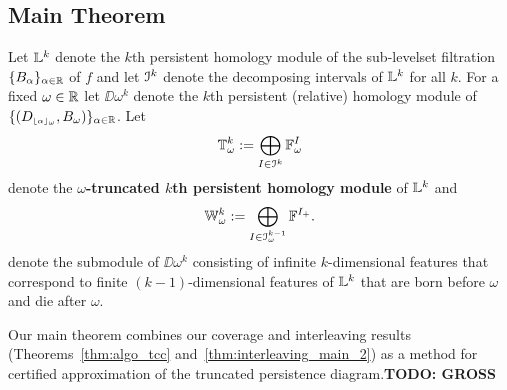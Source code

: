 %

\subsection{Main Theorem}

Let $\mathbb{L}^k$ denote the $k$th persistent homology module of the sub-levelset filtration $\{B_\alpha\}_{\alpha\in\mathbb{R}}$ of $f$ and let $\mathcal{I}^k$ denote the decomposing intervals of $\mathbb{L}^k$ for all $k$.
For a fixed $\omega\in\mathbb{R}$ let $\DD{\omega}^k$ denote the $k$th persistent (relative) homology module of $\{(D_{\scriptscriptstyle \lfloor\alpha\rfloor_{\omega}},B_\omega)\}_{\alpha\in\mathbb{R}}$.
Let
\[\mathbb{T}_\omega^k := \bigoplus_{I\in\mathcal{I}^k} \mathbb{F}_\omega^I\]
denote the \textbf{$\omega$-truncated $k$th persistent homology module} of $\mathbb{L}^k$ and
\[ \mathbb{W}_\omega^k := \bigoplus_{I\in \mathcal{I}_\omega^{k-1}} \mathbb{F}^{I_+}.\]
denote the submodule of $\DD{\omega}^k$ consisting of infinite $k$-dimensional features that correspond to finite $(k-1)$-dimensional features of $\mathbb{L}^k$ that are born before $\omega$ and die after $\omega$.

Our main theorem combines our coverage and interleaving results (Theorems~\ref{thm:algo_tcc} and~\ref{thm:interleaving_main_2}) as a method for certified approximation of the truncated persistence diagram.\textbf{TODO: GROSS}

